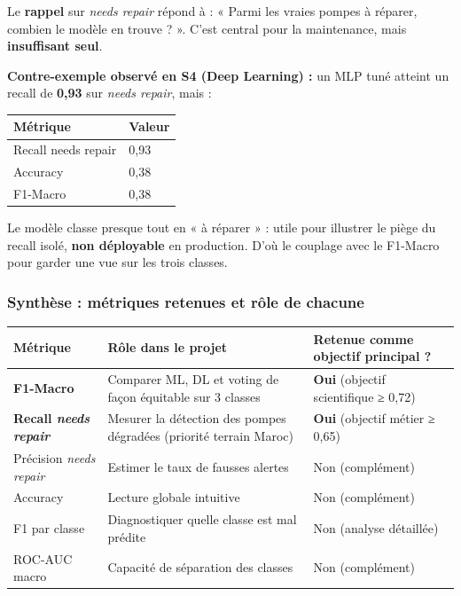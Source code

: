 \documentclass[11pt,a4paper]{report}
\begin{document}
Le \textbf{rappel} sur \textit{needs repair} répond à : « Parmi les vraies pompes à réparer, combien le modèle en trouve ? ». C'est central pour la maintenance, mais \textbf{insuffisant seul}.



\textbf{Contre-exemple observé en S4 (Deep Learning) :} un MLP tuné atteint un recall de \textbf{0,93} sur \textit{needs repair}, mais :



\begin{longtable}{@{}ll@{}}
\toprule
Métrique & Valeur \\
\midrule
Recall needs repair & 0,93 \\
Accuracy & 0,38 \\
F1-Macro & 0,38 \\
\bottomrule
\end{longtable}




Le modèle classe presque tout en « à réparer » : utile pour illustrer le piège du recall isolé, \textbf{non déployable} en production. D'où le couplage avec le F1-Macro pour garder une vue sur les trois classes.



\subsubsection{Synthèse : métriques retenues et rôle de chacune}



\begin{longtable}{@{}lll@{}}
\toprule
Métrique & Rôle dans le projet & Retenue comme objectif principal ? \\
\midrule
\textbf{F1-Macro} & Comparer ML, DL et voting de façon équitable sur 3 classes & \textbf{Oui} (objectif scientifique ≥ 0,72) \\
\textbf{Recall \textit{needs repair}} & Mesurer la détection des pompes dégradées (priorité terrain Maroc) & \textbf{Oui} (objectif métier ≥ 0,65) \\
Précision \textit{needs repair} & Estimer le taux de fausses alertes & Non (complément) \\
Accuracy & Lecture globale intuitive & Non (complément) \\
F1 par classe & Diagnostiquer quelle classe est mal prédite & Non (analyse détaillée) \\
ROC-AUC macro & Capacité de séparation des classes & Non (complément) \\
\bottomrule
\end{longtable}
\end{document}

